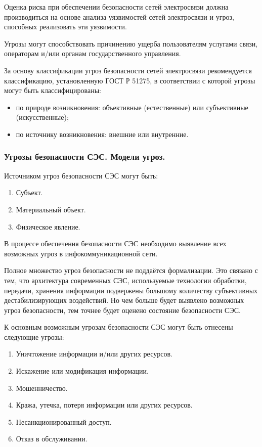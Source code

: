 \documentclass[12pt, russian, oneside, article]{ncc}
\begin{document}
Оценка риска при обеспечении безопасности сетей электросвязи должна производиться на основе анализа уязвимостей сетей электросвязи и угроз, способных реализовать эти уязвимости.

Угрозы могут способствовать причинению ущерба пользователям услугами связи, операторам и/или органам государственного управления.

За основу классификации угроз безопасности сетей электросвязи рекомендуется классификацию, установленную ГОСТ Р 51275, в соответствии с которой угрозы могут быть классифицированы:
\begin{itemize}
\item по природе возникновения: объективные (естественные) или субъективные (искусственные);
\item по источнику возникновения: внешние или внутренние.
\end{itemize}
\subsubsection{Угрозы безопасности СЭС. Модели угроз.}
\label{sec-1_1_4}


Источником угроз безопасности СЭС могут быть:
\begin{enumerate}
\item Субъект.
\item Материальный объект.
\item Физическое явление.
\end{enumerate}

В процессе обеспечения безопасности СЭС необходимо выявление всех возможных угроз в инфокоммуникационной сети.

Полное множество угроз безопасности не поддаётся формализации. Это связано с тем, что архитектура современных СЭС, используемые технологии обработки, передачи, хранения информации подвержены большому количеству субъективных дестабилизирующих воздействий. Но чем больше будет выявлено возможных угроз безопасности, тем точнее будет оценено состояние безопасности СЭС.

К основным возможным угрозам безопасности СЭС могут быть отнесены следующие угрозы:
\begin{enumerate}
\item Уничтожение информации и/или других ресурсов.
\item Искажение или модификация информации.
\item Мошенничество.
\item Кража, утечка, потеря информации или других ресурсов.
\item Несанкционированный доступ.
\item Отказ в обслуживании.
\end{enumerate}
\end{document}
